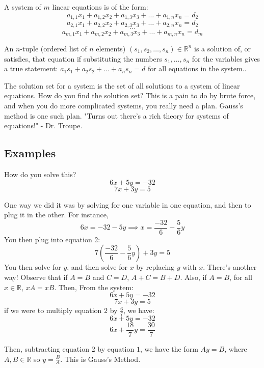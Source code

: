 \documentclass{article}
\begin{document}
\begin{definition}
    A system of $m$ linear equations is of the form:
   \[a_{1,1}x_1 + a_{1,2}x_2 + a_{1,3}x_3 + \dots + a_{1,n}x_n = d_2\]
    \[a_{2,1}x_1 + a_{2,2}x_2 + a_{2,3}x_3 + \dots + a_{2,n}x_n = d_2\]
    \[\dots\]
    \[a_{m,1}x_1 + a_{m,2}x_2 + a_{m,3}x_3 + \dots + a_{m,n}x_n = d_m\]
\end{definition}


\begin{definition}
   An \( n \)-tuple (ordered list of $n$ elements) \( (s_1, s_2, \ldots, s_n) \in \mathbb{R}^n \) is a solution of, or satisfies, that equation if substituting the numbers \( s_1, \ldots, s_n \) for the variables gives a true statement: \( a_1s_1 + a_2s_2 + \ldots + a_ns_n = d \) for all equations in the system.. 
\end{definition}
The solution set for a system is the set of all solutions to a system of linear equations.
\bigbreak
How do you find the solution set?
This is a pain to do by brute force, and when you do more complicated systems, you really need a plan. Gauss's method is one such plan. "Turns out there's a rich theory for systems of equations!" - Dr. Troupe.  
\subsection{Examples}
How do you solve this?
\[6x + 5y = -32\]
\[7x + 3y = 5\]

One way we did it was by solving for one variable in one equation, and then to plug it in the other.
For instance, 
\[6x = -32 - 5y \implies x = \frac{-32}{6} - \frac{5}{6}y\]
You then plug into equation 2:
\[7(\frac{-32}{6} - \frac{5}{6}y) + 3y = 5\]
You then solve for $y$, and then solve for $x$ by replacing $y$ with $x$.
\bigbreak
There's another way!
Observe that if $A=B$ and $C=D$, $A+C = B+D$. Also, if $A=B$, for all $x \in \mathbb{R}$, $xA = xB$.
Then, From the system:
\[6x + 5y = -32\]
\[7x + 3y = 5\]
if we were to multiply equation $2$ by $\frac{6}{7}$, we have:
\[6x + 5y = -32\]
\[6x + \frac{18}{7}y = \frac{30}{7}\]

Then, subtracting equation $2$ by equation $1$, we have the form $Ay = B$, where $A, B \in \mathbb{R}$ so $y = \frac{B}{A}$. This is Gauss's Method.
\end{document}
